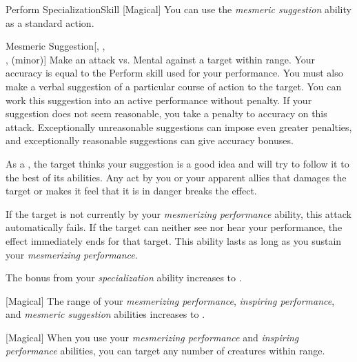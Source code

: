 \begin{feat}{Perform Specialization}{Skill}
        [Magical] You can use the \textit{mesmeric suggestion} ability as a standard action.
        \begin{apability}{Mesmeric Suggestion}[, ,\\,  (minor)]
            Make an attack vs. Mental against a target within \rngmed range.
            Your accuracy is equal to the Perform skill used for your performance.
            You must also make a verbal suggestion of a particular course of action to the target.
            You can work this suggestion into an active performance without penalty.
            If your suggestion does not seem reasonable, you take a  penalty to accuracy on this attack.
            Exceptionally unreasonable suggestions can impose even greater penalties, and exceptionally reasonable suggestions can give accuracy bonuses.

            \hit As a , the target thinks your suggestion is a good idea and will try to follow it to the best of its abilities.
            Any act by you or your apparent allies that damages the target or makes it feel that it is in danger breaks the effect.

            If the target is not currently \fascinated by your \textit{mesmerizing performance} ability, this attack automatically fails.
            If the target can neither see nor hear your performance, the effect immediately ends for that target.
            This ability lasts as long as you sustain your \textit{mesmerizing performance}.
        \end{apability}

         The bonus from your \textit{specialization} ability increases to .

        [Magical] The range of your \textit{mesmerizing performance}, \textit{inspiring performance}, and \textit{mesmeric suggestion} abilities increases to \rnglong.

        [Magical] When you use your \textit{mesmerizing performance} and \textit{inspiring performance} abilities, you can target any number of creatures within range.
    \end{feat}

